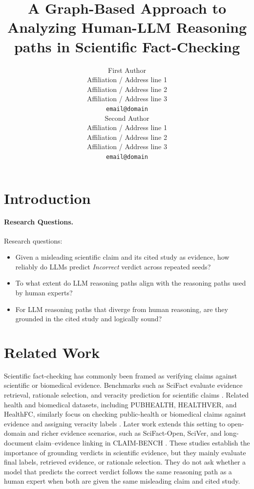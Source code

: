 \documentclass[11pt]{article}
\title{A Graph-Based Approach to Analyzing Human-LLM Reasoning paths in Scientific Fact-Checking}
\author{First Author \\
  Affiliation / Address line 1 \\
  Affiliation / Address line 2 \\
  Affiliation / Address line 3 \\
  \texttt{email@domain} \\\And
  Second Author \\
  Affiliation / Address line 1 \\
  Affiliation / Address line 2 \\
  Affiliation / Address line 3 \\
  \texttt{email@domain} \\}
\begin{document}
\maketitle
\begin{abstract}

\end{abstract}

\section{Introduction}



\paragraph{Research Questions.}
Research questions:

\begin{itemize}
    \item Given a misleading scientific claim and its cited study as evidence, how reliably do LLMs predict \textit{Incorrect} verdict across repeated seeds?

    \item  To what extent do LLM reasoning paths align with the reasoning paths used by human experts?

    \item  For LLM reasoning paths that diverge from human reasoning, are they grounded in the cited study and logically sound?
\end{itemize}

\section{Related Work}

Scientific fact-checking has commonly been framed as verifying claims against scientific or biomedical evidence. Benchmarks such as SciFact evaluate evidence retrieval, rationale selection, and veracity prediction for scientific claims \citep{wadden-etal-2020-fact}. Related health and biomedical datasets, including PUBHEALTH, HEALTHVER, and HealthFC, similarly focus on checking public-health or biomedical claims against evidence and assigning veracity labels \citep{kotonya-toni-2020-explainable-automated,sarrouti-etal-2021-evidence-based,vladika-etal-2024-healthfc}. Later work extends this setting to open-domain and richer evidence scenarios, such as SciFact-Open, SciVer, and long-document claim--evidence linking in CLAIM-BENCH \citep{wadden-etal-2022-scifact,wang-etal-2025-sciver,javaji-etal-2025-ai}. These studies establish the importance of grounding verdicts in scientific evidence, but they mainly evaluate final labels, retrieved evidence, or rationale selection. They do not ask whether a model that predicts the correct verdict follows the same reasoning path as a human expert when both are given the same misleading claim and cited study.
\end{document}
